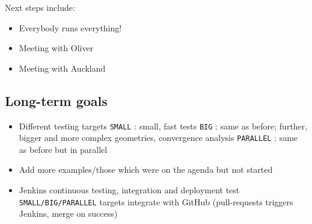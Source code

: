 \noindent Next steps include:
%
\begin{itemize}
    \item Everybody runs everything!
    \item Meeting with Oliver
    \item Meeting with Auckland
\end{itemize}
%
\subsection{Long-term goals}
%
\begin{itemize}
    \item Different testing targets
    \subitem \texttt{SMALL} : small, fast tests
    \subitem \texttt{BIG} : same as before; further, bigger and more complex geometries, convergence analysis
    \subitem \texttt{PARALLEL} : same as before but in parallel
    \item Add more examples/those which were on the agenda but not started
    \item Jenkins continuous testing, integration and deployment
    \subitem test \texttt{SMALL/BIG/PARALLEL} targets
    \subitem integrate with GitHub (pull-requests triggers Jenkins, merge on success)
\end{itemize}
%
